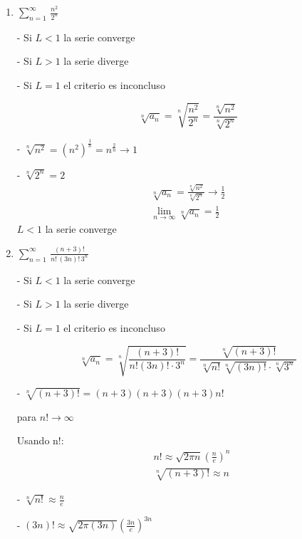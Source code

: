 \documentclass{article}
\begin{document}
\begin{enumerate}
\begin{enumerate}
- Si $ L=1$ el criterio es inconcluso

$$
\sqrt[n]{a_n}=\sqrt[n]{\frac{\sqrt{n}}{n^2+1}}=\frac{\sqrt[n]{\sqrt{n}}}{\sqrt[n]{n^2+1}}
$$
- $\sqrt[n]{\sqrt{n}} \rightarrow(\sqrt{n})^{\frac{1}{n}}=n^{\frac{1}{2 n}} \rightarrow 1$

- $\sqrt[n]{n^2+1} \rightarrow \sqrt[n]{n^2}=\left(n^2\right)^{1 / n}=n^{2 / n} \rightarrow 1$
$$
\lim _{n \rightarrow \infty} \sqrt[n]{a_n}=\frac{1}{1}=1
$$
$L=1$ el criterio es inconcluso

\item $\displaystyle\sum_{n=1}^{\infty}\,\frac{n^2}{2^n}$

- Si $L<1$ la serie converge

- Si $L>1$ la serie diverge

- Si $L=1$ el criterio es inconcluso

$$
\sqrt[n]{a_n}=\sqrt[n]{\frac{n^2}{2^n}}=\frac{\sqrt[n]{n^2}}{\sqrt[n]{2^n}}
$$

- $\sqrt[n]{n^2}=\left(n^2\right)^{\frac{1}{n}}=n^{\frac{2}{n}} \rightarrow 1$

- $\sqrt[n]{2^n}=2$
$$
\begin{array}{r}
\sqrt[n]{a_n}=\frac{\sqrt[n]{n^2}}{\sqrt[n]{2^n}} \rightarrow \frac{1}{2} \\
\lim _{n \rightarrow \infty} \sqrt[n]{a_n}=\frac{1}{2}
\end{array}
$$
$L<1$ la serie converge
\newpage
\item $\displaystyle\sum_{n=1}^{\infty}\,\frac{(n+3)!}{n!\,(3n)!\,3^n}$

- Si $L<1$ la serie converge

- Si $L>1$ la serie diverge

- Si $L=1$ el criterio es inconcluso

$$
\sqrt[n]{a_n}=\sqrt[n]{\frac{(n+3)!}{n!(3 n)!\cdot 3^n}}=\frac{\sqrt[n]{(n+3)!}}{\sqrt[n]{n!} \sqrt[n]{(3 n)!} \cdot \sqrt[n]{3^n}}
$$

- $\sqrt[n]{(n+3)!}=(n+3)(n+3)(n+3) n!$

para $n!\rightarrow \infty$

Usando n!:
$$
\begin{aligned}
& n!\approx \sqrt{2 \pi n}\left(\frac{n}{e}\right)^n \\
& \sqrt[n]{(n+3)!} \approx n
\end{aligned}
$$

- $\sqrt[n]{n!} \approx \frac{n}{e}$

- $(3 n)!\approx \sqrt{2 \pi(3 n)}\left(\frac{3 n}{e}\right)^{3 n}$


\end{enumerate}
\end{enumerate}
\end{document}
